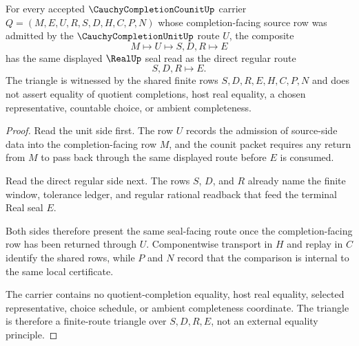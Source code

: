 \begin{theorem}
\label{thm:cauchy-completion-counit-unit-counit-triangle}
For every accepted $\CauchyCompletionCounitUp$ carrier $Q=(M,E,U,R,S,D,H,C,P,N)$ whose completion-facing source row was admitted by the $\CauchyCompletionUnitUp$ route $U$, the composite
$$
M\longmapsto U\longmapsto S,D,R\longmapsto E
$$
has the same displayed $\RealUp$ seal read as the direct regular route
$$
S,D,R\longmapsto E .
$$
The triangle is witnessed by the shared finite rows $S,D,R,E,H,C,P,N$ and does not assert equality of quotient completions, host real equality, a chosen representative, countable choice, or ambient completeness.
\end{theorem}
\begin{proof}
Read the unit side first. The row $U$ records the admission of source-side data into the completion-facing row $M$, and the counit packet requires any return from $M$ to pass back through the same displayed route before $E$ is consumed.

Read the direct regular side next. The rows $S$, $D$, and $R$ already name the finite window, tolerance ledger, and regular rational readback that feed the terminal Real seal $E$.

Both sides therefore present the same seal-facing route once the completion-facing row has been returned through $U$. Componentwise transport in $H$ and replay in $C$ identify the shared rows, while $P$ and $N$ record that the comparison is internal to the same local certificate.

The carrier contains no quotient-completion equality, host real equality, selected representative, choice schedule, or ambient completeness coordinate. The triangle is therefore a finite-route triangle over $S,D,R,E$, not an external equality principle.
\end{proof}

\begin{closurestatus}{\CauchyCompletionCounitUp}
  \theoryclosure{\seedClosure}
  \formalstatus{\unformalizedV}
\end{closurestatus}
